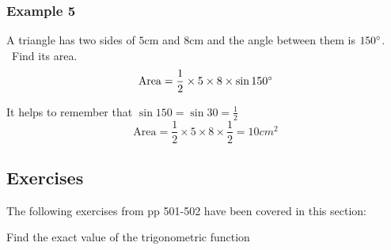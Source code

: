 \subsubsection{Example 5}
A triangle has two sides of $5 \mbox{cm}$ and $8 \mbox{cm}$ and the angle between them is $150 \mbox{{\ensuremath{{}^\circ}}}$. \ Find its area.
\begin{equation*}\text{Area} =\frac{1}{2} \times 5 \times 8 \times \sin  150 \mbox{{\ensuremath{{}^\circ}}}
\end{equation*}

It helps to remember that $\sin  150 =\sin  30 =\frac{1}{2}$
\begin{equation*}\text{Area} =\frac{1}{2} \times 5 \times 8 \times \frac{1}{2} =10 cm^{2}
\end{equation*}

\subsection{Exercises}
The following exercises from pp 501-502 have been covered in this section: 

Find the exact value of the trigonometric function



